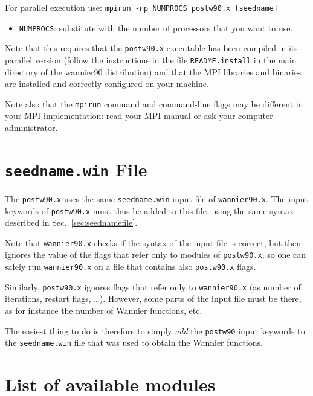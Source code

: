 For parallel execution use: {\tt mpirun -np NUMPROCS postw90.x [seedname]}

\begin{itemize} \item 
{\tt NUMPROCS}: substitute with the number of processors that you want
to use.
\end{itemize}

Note that this requires that the {\tt postw90.x} executable has been
compiled in its parallel version (follow the instructions in the file
{\tt README.install} in the main directory of the wannier90
distribution) and
that the MPI libraries and binaries are installed and correctly
configured on your machine.

Note also that the {\tt mpirun} command and command-line flags may be
different in your MPI implementation: read your MPI manual or ask your
computer administrator.


\section[seedname.win File]{{\tt seedname.win} File}
The \texttt{postw90.x} uses the same \texttt{seedname.win} input file
of \texttt{wannier90.x}. The input keywords of \texttt{postw90.x} must
thus be added to this file, using the same syntax described in
Sec.~\ref{sec:seednamefile}. 

Note that \texttt{wannier90.x} checks if the syntax of the input file
is correct, but then ignores the value of the flags that refer only to
modules of \texttt{postw90.x}, so one can safely run
\texttt{wannier90.x} on a file that contains also \texttt{postw90.x}
flags.

Similarly, \texttt{postw90.x} ignores flags that refer only to
\texttt{wannier90.x} (as number of iterations, restart flags,
\ldots). However, some parts of the input file must be there, as for
instance the number of Wannier functions, etc.

The easiest thing to do
is therefore to simply \emph{add} the \texttt{postw90} input keywords to
the \texttt{seedname.win} file that was used
to obtain the Wannier functions.

\section{List of available modules}

